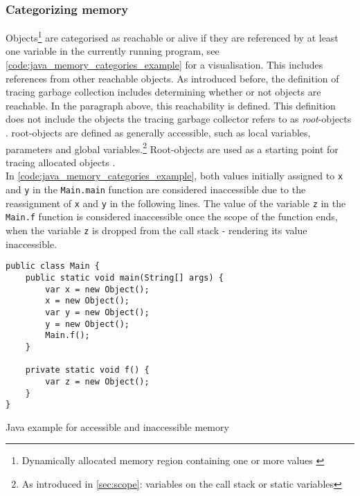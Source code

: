 \subsubsection{Categorizing memory}
\label{sec:categorizing_memory}

Objects\footnote{Dynamically allocated memory region containing one or more
values \cite[Tracing Garbage Collection]{go_gcguide_2022}} are categorised as
reachable or alive if they are referenced by at least one variable in the
currently running program, see \autoref{code:java_memory_categories_example}
for a visualisation. This includes references from other reachable objects. As
introduced before, the definition of tracing garbage collection includes
determining whether or not objects are reachable. In the paragraph above, this
reachability is defined. This definition does not include the objects the
tracing garbage collector refers to as \textit{root}-objects
\cite[Preliminaries: Heap Depth and Tracing]{tracing-gc_barabash_2010}.
root-objects are defined as generally accessible, such as local variables,
parameters and global variables.\footnote{As introduced in \autoref{sec:scope}:
variables on the call stack or static variables} Root-objects are used as a
starting point for tracing allocated objects \cite[Preliminaries: Heap Depth
and Tracing]{tracing-gc_barabash_2010}.\\

In \autoref{code:java_memory_categories_example}, both values initially
assigned to \texttt{x} and \texttt{y} in the \texttt{Main.main} function are
considered inaccessible due to the reassignment of \texttt{x} and \texttt{y}
in the following lines. The value of the variable \texttt{z} in the
\texttt{Main.f} function is considered inaccessible once the scope of the
function ends, when the variable \texttt{z} is dropped from the call stack -
rendering its value inaccessible. 

\begin{listing}[H] 
    \begin{verbatim} 
public class Main {
    public static void main(String[] args) {
        var x = new Object();
        x = new Object();
        var y = new Object();
        y = new Object();
        Main.f();
    }

    private static void f() {
        var z = new Object();
    }
}
    \end{verbatim}
    \caption{Java example for accessible and inaccessible memory}
    \label{code:java_memory_categories_example}
\end{listing}


